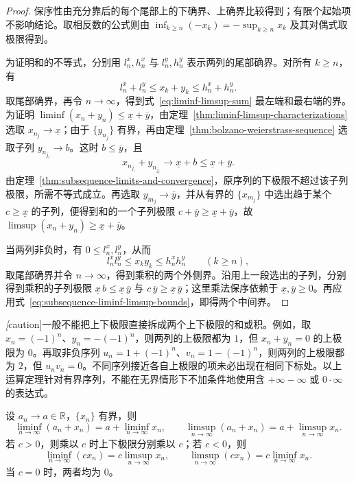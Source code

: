 \begin{proof}
保序性由充分靠后的每个尾部上的下确界、上确界比较得到；有限个起始项不影响结论。取相反数的公式则由 $\inf_{k\geq n}(-x_k)=-\sup_{k\geq n}x_k$ 及其对偶式取极限得到。

为证明和的不等式，分别用 $l_n^x,h_n^x$ 与 $l_n^y,h_n^y$ 表示两列的尾部确界。对所有 $k\geq n$，有
\[
    l_n^x+l_n^y\leq x_k+y_k\leq h_n^x+h_n^y.
\]
取尾部确界，再令 $n\to\infty$，得到式~\eqref{eq:liminf-limsup-sum} 最左端和最右端的界。为证明 $\liminf(x_n+y_n)\leq\underline x+\overline y$，由定理~\ref{thm:liminf-limsup-characterizations} 选取 $x_{n_j}\to\underline x$；由于 $\{y_{n_j}\}$ 有界，再由定理~\ref{thm:bolzano-weierstrass-sequence} 选取子列 $y_{n_{j_i}}\to b$。这时 $b\leq\overline y$，且
\[
    x_{n_{j_i}}+y_{n_{j_i}}\longrightarrow\underline x+b
    \leq\underline x+\overline y.
\]
由定理~\ref{thm:subsequence-limits-and-convergence}，原序列的下极限不超过该子列极限，所需不等式成立。再选取 $y_{m_j}\to\overline y$，并从有界的 $\{x_{m_j}\}$ 中选出趋于某个 $c\geq\underline x$ 的子列，便得到和的一个子列极限 $c+\overline y\geq\underline x+\overline y$，故 $\limsup(x_n+y_n)\geq\underline x+\overline y$。

当两列非负时，有 $0\leq l_n^x,l_n^y$，从而
\[
    l_n^x l_n^y\leq x_k y_k\leq h_n^x h_n^y
    \qquad(k\geq n),
\]
取尾部确界并令 $n\to\infty$，得到乘积的两个外侧界。沿用上一段选出的子列，分别得到乘积的子列极限 $\underline x\,b\leq\underline x\,\overline y$ 与 $c\,\overline y\geq\underline x\,\overline y$；这里乘法保序依赖于 $\underline x,\overline y\geq0$。再应用式~\eqref{eq:subsequence-liminf-limsup-bounds}，即得两个中间界。
\end{proof}

\emph[caution]{一般不能把上下极限直接拆成两个上下极限的和或积。}例如，取 $x_n=(-1)^n$、$y_n=-(-1)^n$，则两列的上极限都为 $1$，但 $x_n+y_n=0$ 的上极限为 $0$。再取非负序列 $u_n=1+(-1)^n$、$v_n=1-(-1)^n$，则两列的上极限都为 $2$，但 $u_nv_n=0$。不同序列接近各自上极限的项未必出现在相同下标处。以上运算定理针对有界序列，不能在无界情形下不加条件地使用含 $+\infty-\infty$ 或 $0\cdot\infty$ 的表达式。

\begin{corollary}[收敛项与常数因子]
\label{cor:liminf-limsup-affine-rules}
设 $a_n\to a\in\mathbb{R}$，$\{x_n\}$ 有界，则
\[
    \liminf_{n\to\infty}(a_n+x_n)=a+\liminf_{n\to\infty}x_n,
    \qquad
    \limsup_{n\to\infty}(a_n+x_n)=a+\limsup_{n\to\infty}x_n.
\]
若 $c>0$，则乘以 $c$ 时上下极限分别乘以 $c$；若 $c<0$，则
\[
    \liminf_{n\to\infty}(cx_n)=c\limsup_{n\to\infty}x_n,
    \qquad
    \limsup_{n\to\infty}(cx_n)=c\liminf_{n\to\infty}x_n.
\]
当 $c=0$ 时，两者均为 $0$。
\end{corollary}

